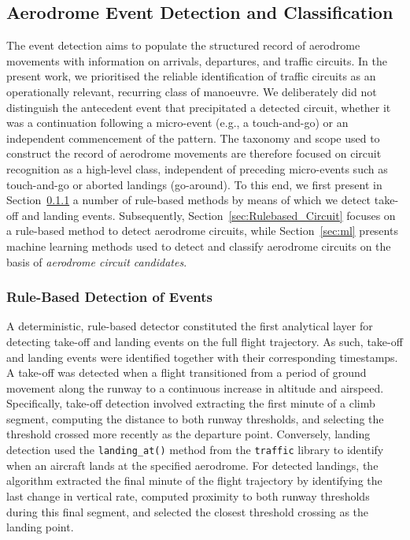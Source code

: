 \documentclass[
  manuscript=proceedings,  %
  layout=preprint,         %
  year=2025,
  volume=x,
]{extra/joas}
\begin{document}
\subsection{Aerodrome Event Detection and Classification}
\label{sec:detection}
The event detection aims to populate the structured record of aerodrome movements with information on arrivals, departures, and traffic circuits. In the present work, we prioritised the reliable identification of traffic circuits as an operationally relevant, recurring class of manoeuvre. We deliberately did not distinguish the antecedent event that precipitated a detected circuit, whether it was a continuation following a micro-event (e.g., a touch-and-go) or an independent commencement of the pattern. The taxonomy and scope used to construct the record of aerodrome movements are therefore focused on circuit recognition as a high-level class, independent of preceding micro-events such as touch-and-go or aborted landings (go-around). To this end, we first present in Section~\ref{sec:rulebased} a number of rule-based methods by means of which we detect take-off and landing events. Subsequently, Section~\ref{sec:Rulebased_Circuit} focuses on a rule-based method to detect aerodrome circuits, while Section~\ref{sec:ml} presents machine learning methods used to detect and classify aerodrome circuits on the basis of \textit{aerodrome circuit candidates}.

\subsubsection{Rule-Based Detection of Events}
\label{sec:rulebased}
A deterministic, rule-based detector constituted the first analytical layer for detecting take-off and landing events on the full flight trajectory. As such, take-off and landing events were identified together with their corresponding timestamps. A take-off was detected when a flight transitioned from a period of ground movement along the runway to a continuous increase in altitude and airspeed. Specifically, take-off detection involved extracting the first minute of a climb segment, computing the distance to both runway thresholds, and selecting the threshold crossed more recently as the departure point. Conversely, landing detection used the \texttt{landing\_at()} method from the \texttt{traffic} library to identify when an aircraft lands at the specified aerodrome. For detected landings, the algorithm extracted the final minute of the flight trajectory by identifying the last change in vertical rate, computed proximity to both runway thresholds during this final segment, and selected the closest threshold crossing as the landing point.
\end{document}
